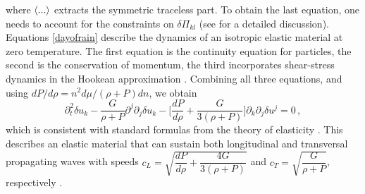 \documentclass[aps,prl,singlecolumn,nofootinbib]{revtex4-2}
\theoremstyle{definition}
\theoremstyle{theorem}
\begin{document}
where $\braket{...}$ extracts the symmetric traceless part. To obtain the last equation,  one needs to account for the constraints on $\delta \Pi_{kl}$ (see \cite{GavassinoCasmir2022} for a detailed discussion). Equations \eqref{dayofrain} describe the dynamics of an isotropic elastic material at zero temperature. The first equation is the continuity equation for particles, the second is the conservation of momentum, the third incorporates shear-stress dynamics in the Hookean approximation \cite{Schumaker1983}. Combining all three equations, and using $dP/d\rho = n^2 d\mu/(\rho {+} P)dn$, we obtain
\begin{equation}\label{anotherdayofsun}
    \partial^2_t \delta u_k -  \dfrac{G}{\rho {+} P} \partial^j \partial_j \delta u_k -\bigg[\dfrac{dP}{d\rho} + \dfrac{G}{3(\rho {+} P)} \bigg] \partial_k \partial_j \delta u^j =0 \, ,
\end{equation}
which is consistent with standard formulas from the theory of elasticity \cite{landau7}. This describes an elastic material that can sustain both longitudinal and transversal propagating waves with speeds $c_L=\sqrt{\dfrac{dP}{d\rho} + \dfrac{4G}{3(\rho {+}P)}}$ and $c_T= \sqrt{\dfrac{G}{\rho {+} P}}$, respectively \cite{landau7}.

\end{document}
